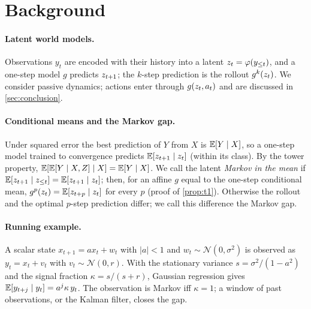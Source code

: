\section{Background}
\label{sec:background}

\paragraph{Latent world models.}
Observations $y_t$ are encoded with their history into a latent $z_{t} = \varphi(y_{\le t})$, and a one-step model $g$ predicts $z_{t+1}$; the $k$-step prediction is the rollout $g^{k}(z_{t})$. We consider passive dynamics; actions enter through $g(z_{t}, a_t)$ and are discussed in \cref{sec:conclusion}.

\paragraph{Conditional means and the Markov gap.}
Under squared error the best prediction of $Y$ from $X$ is $\mathbb{E}[Y \mid X]$, so a one-step model trained to convergence predicts $\mathbb{E}[z_{t+1} \mid z_{t}]$ (within its class). By the tower property, $\mathbb{E}[\mathbb{E}[Y \mid X, Z] \mid X] = \mathbb{E}[Y \mid X]$. We call the latent \emph{Markov in the mean} if $\mathbb{E}[z_{t+1} \mid z_{\le t}] = \mathbb{E}[z_{t+1} \mid z_{t}]$; then, for an affine $g$ equal to the one-step conditional mean, $g^{p}(z_{t}) = \mathbb{E}[z_{t+p} \mid z_{t}]$ for every $p$ (proof of \cref{prop:t1}). Otherwise the rollout and the optimal $p$-step prediction differ; we call this difference the Markov gap.

\paragraph{Running example.}
A scalar state $x_{t+1} = a x_t + w_t$ with $|a| < 1$ and $w_t \sim \mathcal N(0, \sigma^2)$ is observed as $y_t = x_t + v_t$ with $v_t \sim \mathcal N(0, r)$. With the stationary variance $s = \sigma^2 / (1 - a^2)$ and the signal fraction $\kappa = s / (s + r)$, Gaussian regression gives $\mathbb{E}[y_{t+j} \mid y_t] = a^{j} \kappa \, y_t$. The observation is Markov iff $\kappa = 1$; a window of past observations, or the Kalman filter, closes the gap.
